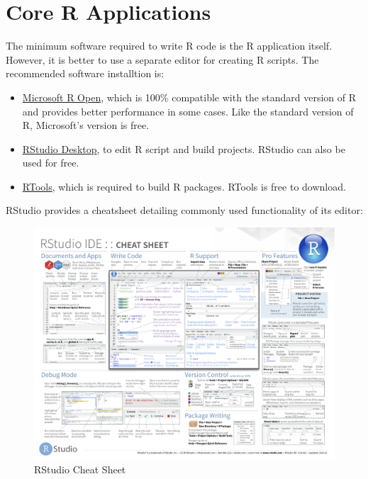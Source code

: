 \documentclass[]{book}
\providecommand{\tightlist}{%
  \setlength{\itemsep}{0pt}\setlength{\parskip}{0pt}}
\theoremstyle{definition}
\theoremstyle{definition}
\theoremstyle{definition}
\theoremstyle{remark}
\begin{document}
\section{Core R Applications}\label{core-r-applications}

The minimum software required to write R code is the R application
itself. However, it is better to use a separate editor for creating R
scripts. The recommended software installtion is:

\begin{itemize}
\tightlist
\item
  \href{https://mran.microsoft.com/open/}{Microsoft R Open}, which is
  100\% compatible with the standard version of R and provides better
  performance in some cases. Like the standard version of R, Microsoft's
  version is free.
\item
  \href{https://www.rstudio.com/products/rstudio/download/}{RStudio
  Desktop}, to edit R script and build projects. RStudio can also be
  used for free.
\item
  \href{https://cran.r-project.org/bin/windows/Rtools/}{RTools}, which
  is required to build R packages. RTools is free to download.
\end{itemize}

RStudio provides a cheatsheet detailing commonly used functionality of
its editor:

\begin{figure}

{\centering \includegraphics[width=0.8\linewidth]{images/rstudio-ide} 

}

\caption{RStudio Cheat Sheet}\label{fig:rstudio-cheatsheet}
\end{figure}
\end{document}
